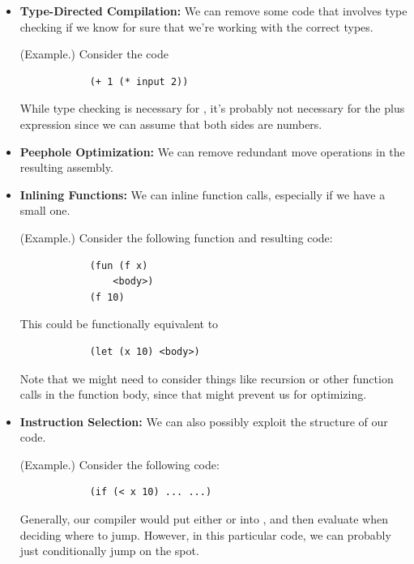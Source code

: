 \begin{itemize}
    \item \textbf{Type-Directed Compilation:} We can remove some code that involves type checking if we know for sure that we're working with the correct types. 
    \begin{mdframed}
        (Example.) Consider the code 
        \begin{verbatim}
            (+ 1 (* input 2))\end{verbatim}
        While type checking is necessary for , it's probably not necessary for the plus expression since we can assume that both sides are numbers.
    \end{mdframed}

    \item \textbf{Peephole Optimization:} We can remove redundant move operations in the resulting assembly. 
    
    \item \textbf{Inlining Functions:} We can inline function calls, especially if we have a small one. 
    \begin{mdframed}
        (Example.) Consider the following function and resulting code: 
        \begin{verbatim}
            (fun (f x)
                <body>)
            (f 10)\end{verbatim}
        This could be functionally equivalent to  
        \begin{verbatim}
            (let (x 10) <body>)\end{verbatim}
    \end{mdframed}
    Note that we might need to consider things like recursion or other function calls in the function body, since that might prevent us for optimizing. 

    \item \textbf{Instruction Selection:} We can also possibly exploit the structure of our code. 
    \begin{mdframed}
        (Example.) Consider the following code: 
        \begin{verbatim}
            (if (< x 10) ... ...)\end{verbatim}
        Generally, our compiler would put either  or  into , and then evaluate  when deciding where to jump. However, in this particular code, we can probably just conditionally jump on the spot.  
    \end{mdframed}
\end{itemize}

